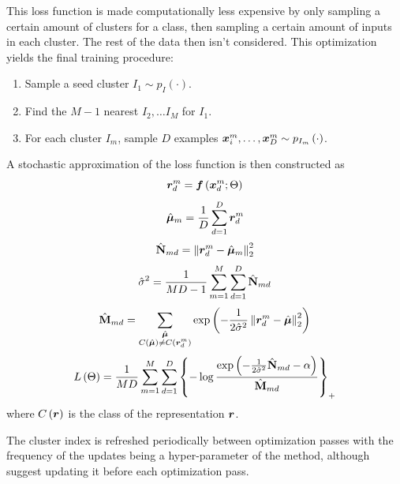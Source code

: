 This loss function is made computationally less expensive by only sampling a certain amount of clusters for a class, then sampling a certain amount of inputs in each cluster. The rest of the data then isn't considered. This optimization yields the final training procedure:

\begin{enumerate}
  \item Sample a seed cluster \( I_1 \sim p_I \left( \cdot \right) \).
  \item Find the \( M - 1 \) nearest  \( I_2, \dots I_M \) for \( I_1 \).
  \item For each cluster \( I_m \), sample \( D \) examples \( \bm{x}_i^m, \dots, \bm{x}_D^m \sim p_{I_m} \left( \cdot \right) \).
\end{enumerate}

A stochastic approximation of the loss function is then constructed as
\[ \bm{r}_d^m = \bm{f} \left( \bm{x}_d^m; \Theta \right) \]
\[ \hat{\bm{\mu}}_m = \frac{1}{D} \sum_{d = 1}^D \bm{r}_d^m \]
\[ \hat{\mathbf{N}}_{md} = \left\lVert \bm{r}_d^m - \hat{\bm{\mu}}_m \right\rVert_2^2 \]
\[ \hat{\sigma}^2 = \frac{1}{MD - 1} \sum_{m = 1}^M \sum_{d = 1}^D \hat{\mathbf{N}}_{md} \]
\[ \hat{\mathbf{M}}_{md} = \sum_{\substack{\hat{\bm{\mu}} \\ C \left( \hat{\bm{\mu}} \right) \neq C \left( \bm{r}_d^m \right)}} \exp \left( - \frac{1}{2 \hat{\sigma}^2} \left\lVert \bm{r}_d^m - \hat{\bm{\mu}} \right\rVert_2^2 \right) \]
\[ L \left( \Theta \right) = \frac{1}{MD} \sum_{m = 1}^M \sum_{d = 1}^D \left\{ - \log \frac{\exp \left( - \frac{1}{2 \hat{\sigma}^2} \hat{\mathbf{N}}_{md} - \alpha \right)}{ \hat{\mathbf{M}}_{md} } \right\}_+ \]
where \( C \left( \bm{r} \right) \) is the class of the representation \( \bm{r} \).

The cluster index is refreshed periodically between optimization passes with the frequency of the updates being a hyper-parameter of the method, although \cite{rippel_metric_2015} suggest updating it before each optimization pass.

